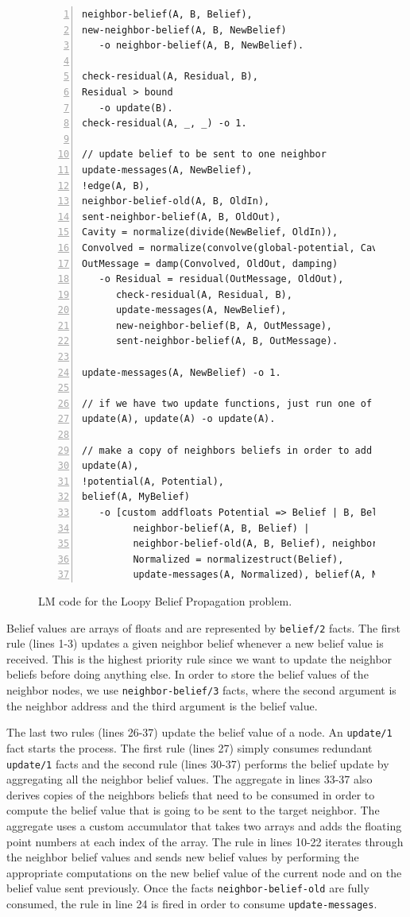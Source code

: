\begin{figure}[h!]
   \begin{Verbatim}[numbers=left, fontsize=\scriptsize]
neighbor-belief(A, B, Belief),
new-neighbor-belief(A, B, NewBelief)
   -o neighbor-belief(A, B, NewBelief).

check-residual(A, Residual, B),
Residual > bound
   -o update(B).
check-residual(A, _, _) -o 1.

// update belief to be sent to one neighbor
update-messages(A, NewBelief),
!edge(A, B),
neighbor-belief-old(A, B, OldIn),
sent-neighbor-belief(A, B, OldOut),
Cavity = normalize(divide(NewBelief, OldIn)),
Convolved = normalize(convolve(global-potential, Cavity)),
OutMessage = damp(Convolved, OldOut, damping)
   -o Residual = residual(OutMessage, OldOut),
      check-residual(A, Residual, B),
      update-messages(A, NewBelief),
      new-neighbor-belief(B, A, OutMessage),
      sent-neighbor-belief(A, B, OutMessage).

update-messages(A, NewBelief) -o 1.

// if we have two update functions, just run one of them
update(A), update(A) -o update(A).

// make a copy of neighbors beliefs in order to add them up
update(A),
!potential(A, Potential),
belief(A, MyBelief)
   -o [custom addfloats Potential => Belief | B, Belief |
         neighbor-belief(A, B, Belief) |
         neighbor-belief-old(A, B, Belief), neighbor-belief(A, B, Belief) |
         Normalized = normalizestruct(Belief),
         update-messages(A, Normalized), belief(A, Normalized)].
\end{Verbatim}
\caption{LM code for the Loopy Belief Propagation problem.}
\label{code:coordination:bp}
\end{figure}

Belief values are arrays of floats and are represented by \texttt{belief/2}
facts. The first rule (lines 1-3) updates a given neighbor belief whenever a new
belief value is received. This is the highest priority rule since we want to
update the neighbor beliefs before doing anything else. In order to store the
belief values of the neighbor nodes, we use \texttt{neighbor-belief/3} facts,
where the second argument is the neighbor address and the third argument is the
belief value.

The last two rules (lines 26-37) update the belief value of a node. An
\texttt{update/1} fact starts the process. The first rule (lines 27) simply
consumes redundant \texttt{update/1} facts and the second rule (lines 30-37)
performs the belief update by aggregating all the neighbor belief values. The
aggregate in lines 33-37 also derives copies of the neighbors beliefs that need
to be consumed in order to compute the belief value that is going to be sent to
the target neighbor. The aggregate uses a custom accumulator that takes two
arrays and adds the floating point numbers at each index of the array.  The rule
in lines 10-22 iterates through the neighbor belief values and sends new belief
values by performing the appropriate computations on the new belief value of the
current node and on the belief value sent previously.  Once the facts
\texttt{neighbor-belief-old} are fully consumed, the rule in line 24 is fired in
order to consume \texttt{update-messages}.

